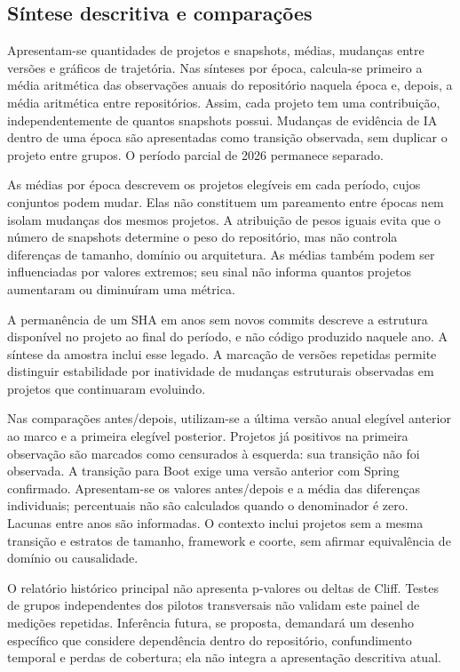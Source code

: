 \subsection{Síntese descritiva e comparações}
\label{subsec:estatistica}

Apresentam-se quantidades de projetos e snapshots, médias, mudanças entre versões e gráficos de trajetória. Nas sínteses por época, calcula-se primeiro a média aritmética das observações anuais do repositório naquela época e, depois, a média aritmética entre repositórios. Assim, cada projeto tem uma contribuição, independentemente de quantos snapshots possui. Mudanças de evidência de IA dentro de uma época são apresentadas como transição observada, sem duplicar o projeto entre grupos. O período parcial de 2026 permanece separado.

As médias por época descrevem os projetos elegíveis em cada período, cujos conjuntos podem mudar. Elas não constituem um pareamento entre épocas nem isolam mudanças dos mesmos projetos. A atribuição de pesos iguais evita que o número de snapshots determine o peso do repositório, mas não controla diferenças de tamanho, domínio ou arquitetura. As médias também podem ser influenciadas por valores extremos; seu sinal não informa quantos projetos aumentaram ou diminuíram uma métrica.

A permanência de um SHA em anos sem novos commits descreve a estrutura disponível no projeto ao final do período, e não código produzido naquele ano. A síntese da amostra inclui esse legado. A marcação de versões repetidas permite distinguir estabilidade por inatividade de mudanças estruturais observadas em projetos que continuaram evoluindo.

Nas comparações antes/depois, utilizam-se a última versão anual elegível anterior ao marco e a primeira elegível posterior. Projetos já positivos na primeira observação são marcados como censurados à esquerda: sua transição não foi observada. A transição para Boot exige uma versão anterior com Spring confirmado. Apresentam-se os valores antes/depois e a média das diferenças individuais; percentuais não são calculados quando o denominador é zero. Lacunas entre anos são informadas. O contexto inclui projetos sem a mesma transição e estratos de tamanho, framework e coorte, sem afirmar equivalência de domínio ou causalidade.

O relatório histórico principal não apresenta p-valores ou deltas de Cliff. Testes de grupos independentes dos pilotos transversais não validam este painel de medições repetidas. Inferência futura, se proposta, demandará um desenho específico que considere dependência dentro do repositório, confundimento temporal e perdas de cobertura; ela não integra a apresentação descritiva atual.

